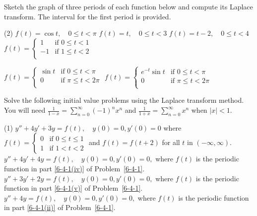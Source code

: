 \begin{Exercise}\label{EX74}
	\vspace{-\baselineskip}%
	\Question\label{6-4-1} Sketch the graph of three periods of each function below and compute its Laplace transform. The interval for the first period is provided.
	\begin{tasks}[resume=false](2)
		\task \label{6-4-1(i)} $f(t) = \cos t, \quad 0\le t < \pi$
		\task\label{6-4-1(ii)} $f(t) =  t, \quad 0\le t < 3$
		\task\label{6-4-1(iii)} $f(t) =t-2, \quad 0\le t  < 4$
		\task\label{6-4-1(iv)} $f(t) = \begin{cases}
			1	& \text{if } 0\le t< 1\\
			-1 		& \text{if } 1\le  t< 2\\
		\end{cases}$
		
		\task\label{6-4-1(v)} $f(t) = \begin{cases}
			\sin t 	& \text{if } 0\le t< \pi\\
			0 		& \text{if } \pi\le  t< 2\pi\\
		\end{cases}$
		\task\label{6-4-1(vi)} \(f(t) = \begin{cases}
		e^{-t}\sin t 	& \text{if } 0\le t< \pi\\
		0 		& \text{if } \pi\le  t< 2\pi\\
	\end{cases}\)
	\end{tasks}
	
	
	\Question Solve the following initial value problems using the Laplace transform method. You will need $\frac{1}{1-x} = \sum_{n=0}^\infty (-1)^n x^n$ and $\frac{1}{1+x} = \sum_{n=0}^\infty  x^n$  when $|x| <1.$
	\begin{tasks}[resume=false](1)
		\task $y''+4y'+3y = f(t), \quad y(0) = 0, y'(0) = 0$ where \(f(t) =\begin{cases}
			0 &\text{if } 0\le  t\le 1\\
			1 &\text{if } 1< t < 2 
		\end{cases}\)
		 and $f(t) = f(t+2)$ for all $t$ in $(-\infty, \infty).$ 
	\task $y''+4y'+4y = f(t),\quad y(0) = 0, y'(0) = 0,$ where 
	\(f(t)\) is the periodic function in part \ref{6-4-1(iv)} of Problem~\ref{6-4-1}.
	\task $y''+3y'+2y = f(t),\quad y(0) = 0, y'(0) = 0,$ where 
	\(f(t)\) is the periodic function in part \ref{6-4-1(v)} of Problem~\ref{6-4-1}.
		\task $y''+4y = f(t),\quad y(0) = 0, y'(0) = 0,$ where 
	\(f(t)\) is the periodic function in part \ref{6-4-1(ii)} of Problem~\ref{6-4-1}.	
	\end{tasks}
	
\end{Exercise}

